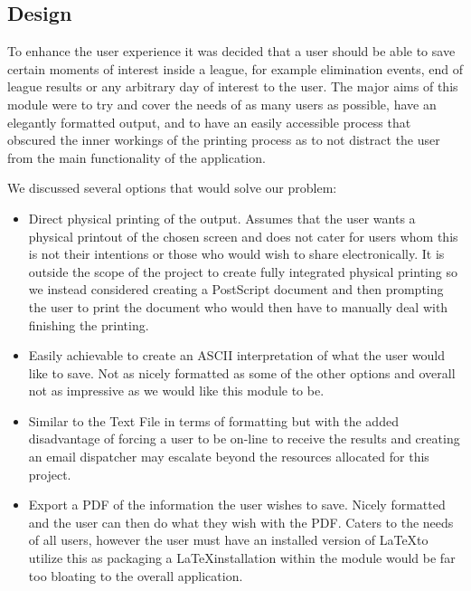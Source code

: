 \subsection{Design}

To enhance the user experience it was decided that a user should be
able to save certain moments of interest inside a league, for example
elimination events, end of league results or any arbitrary day of
interest to the user. The major aims of this module were to try and
cover the needs of as many users as possible, have an elegantly
formatted output, and to have an easily accessible process that
obscured the inner workings of the printing process as to not distract
the user from the main functionality of the application.

We discussed several options that would solve our problem:

\begin{itemize}
  \item[Physical Printing] Direct physical printing of the
    output. Assumes that the user wants a physical printout of the
    chosen screen and does not cater for users whom this is not their
    intentions or those who would wish to share electronically. It is
    outside the scope of the project to create fully integrated
    physical printing so we instead considered creating a PostScript
    document and then prompting the user to print the document who
    would then have to manually deal with finishing the printing.
  \item[Text File] Easily achievable to create an ASCII interpretation
    of what the user would like to save. Not as nicely formatted as
    some of the other options and overall not as impressive as we
    would like this module to be.
  \item[Emailed results] Similar to the Text File in terms of
    formatting but with the added disadvantage of forcing a user to
    be on-line to receive the results and creating an email dispatcher
    may escalate beyond the resources allocated for this project.
  \item[\LaTeX] Export a PDF of the information the user wishes to
    save. Nicely formatted and the user can then do what they wish
    with the PDF. Caters to the needs of all users, however the user
    must have an installed version of \LaTeX to utilize this as
    packaging a \LaTeX installation within the module would be far too
    bloating to the overall application.
\end{itemize}

